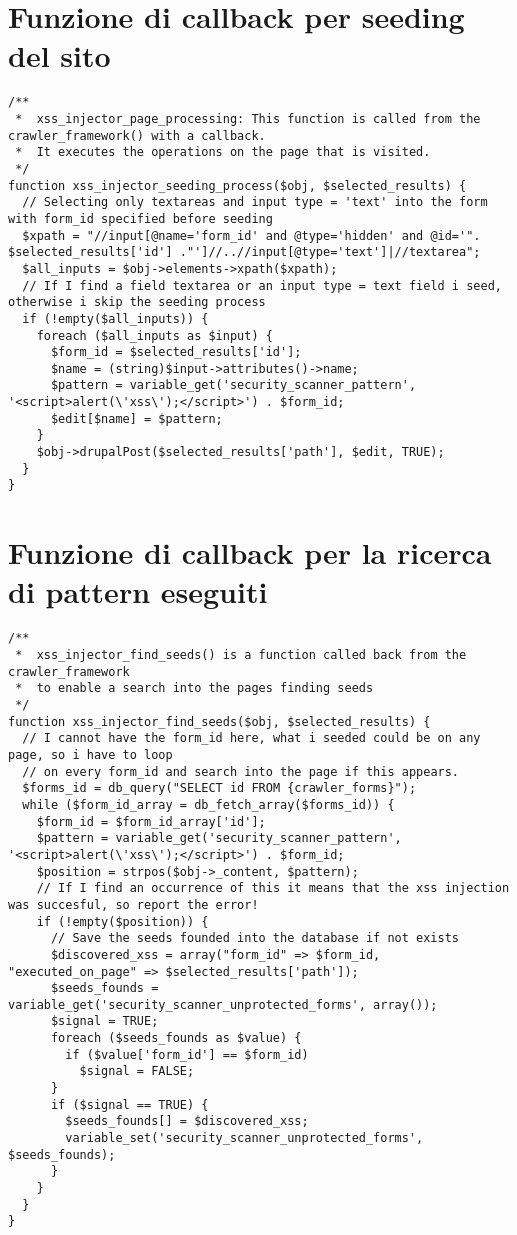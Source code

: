 \section{Funzione di callback per seeding del sito}
\begin{lstlisting}
/**
 *  xss_injector_page_processing: This function is called from the crawler_framework() with a callback.
 *  It executes the operations on the page that is visited.   
 */
function xss_injector_seeding_process($obj, $selected_results) {
  // Selecting only textareas and input type = 'text' into the form with form_id specified before seeding
  $xpath = "//input[@name='form_id' and @type='hidden' and @id='". $selected_results['id'] ."']//..//input[@type='text']|//textarea";
  $all_inputs = $obj->elements->xpath($xpath);
  // If I find a field textarea or an input type = text field i seed, otherwise i skip the seeding process
  if (!empty($all_inputs)) {
    foreach ($all_inputs as $input) {
      $form_id = $selected_results['id'];
      $name = (string)$input->attributes()->name;
      $pattern = variable_get('security_scanner_pattern', '<script>alert(\'xss\');</script>') . $form_id;
      $edit[$name] = $pattern;
    }
    $obj->drupalPost($selected_results['path'], $edit, TRUE);
  }
}
\end{lstlisting}
\section{Funzione di callback per la ricerca di pattern eseguiti}
\begin{lstlisting}
/**
 *  xss_injector_find_seeds() is a function called back from the crawler_framework
 *  to enable a search into the pages finding seeds
 */
function xss_injector_find_seeds($obj, $selected_results) {
  // I cannot have the form_id here, what i seeded could be on any page, so i have to loop
  // on every form_id and search into the page if this appears.
  $forms_id = db_query("SELECT id FROM {crawler_forms}");
  while ($form_id_array = db_fetch_array($forms_id)) {
    $form_id = $form_id_array['id'];
    $pattern = variable_get('security_scanner_pattern', '<script>alert(\'xss\');</script>') . $form_id;
    $position = strpos($obj->_content, $pattern);
    // If I find an occurrence of this it means that the xss injection was succesful, so report the error!
    if (!empty($position)) {
      // Save the seeds founded into the database if not exists
      $discovered_xss = array("form_id" => $form_id, "executed_on_page" => $selected_results['path']);
      $seeds_founds = variable_get('security_scanner_unprotected_forms', array());
      $signal = TRUE;
      foreach ($seeds_founds as $value) {
        if ($value['form_id'] == $form_id)
          $signal = FALSE;
      }
      if ($signal == TRUE) {
        $seeds_founds[] = $discovered_xss;
        variable_set('security_scanner_unprotected_forms', $seeds_founds);
      }
    }
  }
}
\end{lstlisting}